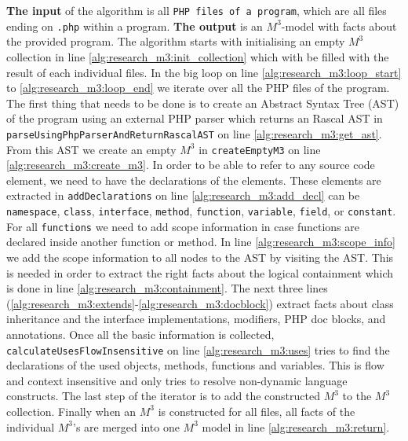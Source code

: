 \documentclass[../main.tex]{subfiles}
\begin{document}
	\textbf{The input} of the algorithm is all \texttt{PHP files of a program}, which are all files ending on \texttt{.php} within a program.
    \textbf{The output} is an $M^3$-model with facts about the provided program.
    The algorithm starts with initialising an empty $M^3$ collection in line \ref{alg:research_m3:init_collection} which with be filled with the result of each individual files.
    In the big loop on line \ref{alg:research_m3:loop_start} to \ref{alg:research_m3:loop_end} we iterate over all the PHP files of the program.
    The first thing that needs to be done is to create an \gls{Abstract Syntax Tree} (AST) of the program using an external PHP parser\footnotemark{} which returns an Rascal AST in \texttt{parseUsingPhpParserAndReturnRascalAST} on line \ref{alg:research_m3:get_ast}.
    From this AST we create an empty $M^3$ in \texttt{createEmptyM3} on line \ref{alg:research_m3:create_m3}.
    In order to be able to refer to any source code element, we need to have the declarations of the elements.
    These elements are extracted in \texttt{addDeclarations} on line \ref{alg:research_m3:add_decl} can be \texttt{namespace}, \texttt{class}, \texttt{interface}, \texttt{method},  \texttt{function}, \texttt{variable}, \texttt{field}, or \texttt{constant}.
    For all \texttt{functions} we need to add scope information in case functions are declared inside another function or method.
    In line \ref{alg:research_m3:scope_info} we add the scope information to all nodes to the AST by visiting the AST.
    This is needed in order to extract the right facts about the logical containment which is done in line \ref{alg:research_m3:containment}.
    The next three lines (\ref{alg:research_m3:extends}-\ref{alg:research_m3:docblock}) extract facts about class inheritance and the interface implementations, modifiers, PHP doc blocks, and annotations.
   	Once all the basic information is collected, \texttt{calculateUsesFlowInsensitive} on line \ref{alg:research_m3:uses} tries to find the declarations of the used objects, methods, functions and variables.
   	This is flow and context insensitive and only tries to resolve non-dynamic language constructs.
   	The last step of the iterator is to add the constructed $M^3$ to the $M^3$ collection.
   	Finally when an $M^3$ is constructed for all files, all facts of the individual $M^3$'s are merged into one $M^3$ model in line \ref{alg:research_m3:return}. 
    
\end{document}
